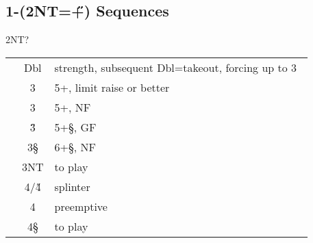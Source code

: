 \subsection{1\D-(2NT=\H+\C) Sequences}

\begin{bidding}
\>\D\>2NT\>?
\end{bidding}

\begin{longtable}{C{\linklength} C{\bidlength} l}
& Dbl & strength, subsequent Dbl=takeout, forcing up to 3\D\ \\
& 3\C & 5+\D, limit raise or better \\
& 3\D & 5+\D, NF \\
& 3\H & 5+\S, GF \\
& 3\S & 6+\S, NF \\
& 3NT & to play \\
& 4\C/4\H & splinter \\
& 4\D & preemptive \\
& 4\S & to play \\
\end{longtable}
